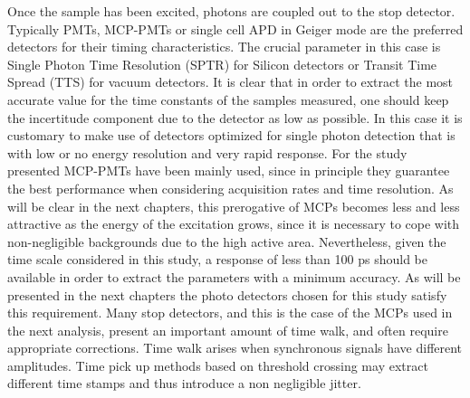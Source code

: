Once the sample has been excited, photons are coupled out to the stop detector. Typically PMTs, MCP-PMTs or single cell APD in Geiger mode are the preferred detectors for their timing characteristics. The crucial parameter in this case is Single Photon Time Resolution (SPTR) for Silicon detectors or Transit Time Spread (TTS) for vacuum detectors.
It is clear that in order to extract the most accurate value for the time constants of the samples measured, one should keep the incertitude component due to the detector as low as possible. In this case it is customary to make use of detectors optimized for single photon detection that is with low or no energy resolution and very rapid response.
For the study presented MCP-PMTs have been mainly used, since in principle they guarantee the best performance when considering acquisition rates and time resolution.
As will be clear in the next chapters, this prerogative of MCPs becomes less and less attractive as the energy of the excitation grows, since it is necessary to cope with non-negligible backgrounds due to the high active area.
Nevertheless, given the time scale considered in this study, a response of less than 100 ps should be available in order to extract the parameters with a minimum accuracy. As will be presented in the next chapters the photo detectors chosen for this study satisfy this requirement.
Many stop detectors, and this is the case of the MCPs used in the next analysis, present an important amount of time walk, and often require appropriate corrections.
Time walk arises when synchronous signals have different amplitudes. Time pick up methods based on threshold crossing may extract different time stamps and thus introduce a non negligible jitter.

